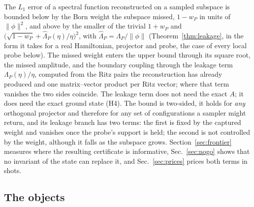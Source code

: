 %
%
%
%
%
%
The $L_1$ error of a spectral function reconstructed on a sampled subspace is bounded below by the
Born weight the subspace missed, $1-w_P$ in units of $\lVert\phi\rVert^{2}$, and above by the smaller of
the trivial $1+w_P$ and $\bigl(\sqrt{1-w_P}+\widehat\Lambda_P(\eta)/\eta\bigr)^{2}$, with
$\widehat\Lambda_P=\Lambda_P/\lVert\phi\rVert$ (Theorem~\ref{thm:leakage}, in the form it takes for a real
Hamiltonian, projector and probe, the case of every local probe below). The missed weight enters the
upper bound through its square root, the missed amplitude, and the boundary coupling through the
leakage term $\Lambda_P(\eta)/\eta$, computed from the Ritz pairs the reconstruction has already
produced and one matrix--vector product per Ritz vector; where that term vanishes the two sides coincide. The leakage term does not need the exact $A$; it does need the exact ground
state (H4). The bound is two-sided, it holds for \emph{any} orthogonal projector and therefore for any set
of configurations a sampler might return, and its leakage branch has two terms: the first is fixed by the
captured weight and vanishes once the probe's support is held; the second is not controlled by the weight,
although it falls as the subspace grows. Section~\ref{sec:frontier} measures where the resulting
certificate is informative, Sec.~\ref{sec:nogo} shows that no invariant of the state can replace it, and
Sec.~\ref{sec:prices} prices both terms in shots.

\subsection{The objects}


